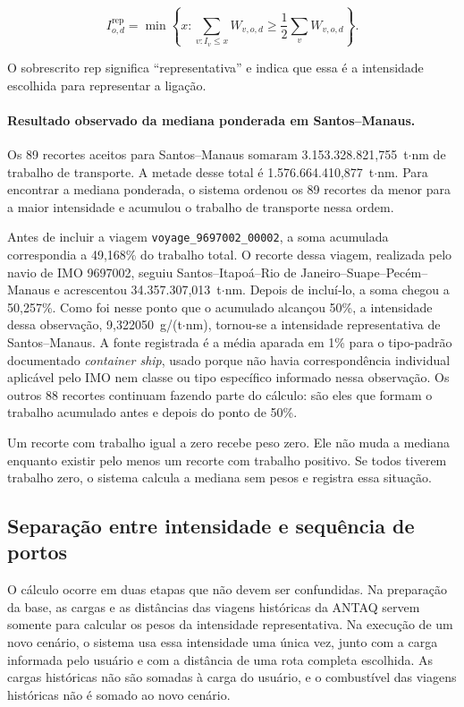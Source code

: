 \documentclass[12pt,a4paper]{article}
\begin{document}
\begin{equation}
I_{o,d}^{\mathrm{rep}}=
\min\left\{x:\sum_{v:I_v\leq x}W_{v,o,d}
\geq\frac{1}{2}\sum_vW_{v,o,d}\right\}.
\label{eq:mediana-ponderada}
\end{equation}

O sobrescrito $\mathrm{rep}$ significa ``representativa'' e indica que essa é a intensidade escolhida para representar a ligação.

\paragraph{Resultado observado da mediana ponderada em Santos--Manaus.}
Os 89 recortes aceitos para Santos--Manaus somaram 3.153.328.821,755~t$\cdot$nm de trabalho de transporte. A metade desse total é 1.576.664.410,877~t$\cdot$nm. Para encontrar a mediana ponderada, o sistema ordenou os 89 recortes da menor para a maior intensidade e acumulou o trabalho de transporte nessa ordem.

Antes de incluir a viagem \texttt{voyage\_9697002\_00002}, a soma acumulada correspondia a 49,168\% do trabalho total. O recorte dessa viagem, realizada pelo navio de IMO 9697002, seguiu Santos--Itapoá--Rio de Janeiro--Suape--Pecém--Manaus e acrescentou 34.357.307,013~t$\cdot$nm. Depois de incluí-lo, a soma chegou a 50,257\%. Como foi nesse ponto que o acumulado alcançou 50\%, a intensidade dessa observação, 9,322050~g/(t$\cdot$nm), tornou-se a intensidade representativa de Santos--Manaus. A fonte registrada é a média aparada em 1\% para o tipo-padrão documentado \emph{container ship}, usado porque não havia correspondência individual aplicável pelo IMO nem classe ou tipo específico informado nessa observação. Os outros 88 recortes continuam fazendo parte do cálculo: são eles que formam o trabalho acumulado antes e depois do ponto de 50\%.

Um recorte com trabalho igual a zero recebe peso zero. Ele não muda a mediana enquanto existir pelo menos um recorte com trabalho positivo. Se todos tiverem trabalho zero, o sistema calcula a mediana sem pesos e registra essa situação.

\subsection{Separação entre intensidade e sequência de portos}
\label{subsec:corredor}

O cálculo ocorre em duas etapas que não devem ser confundidas. Na preparação da base, as cargas e as distâncias das viagens históricas da ANTAQ servem somente para calcular os pesos da intensidade representativa. Na execução de um novo cenário, o sistema usa essa intensidade uma única vez, junto com a carga informada pelo usuário e com a distância de uma rota completa escolhida. As cargas históricas não são somadas à carga do usuário, e o combustível das viagens históricas não é somado ao novo cenário.
\end{document}
